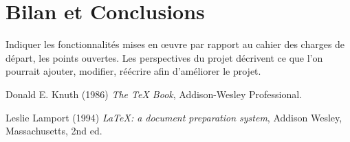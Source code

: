 \documentclass[a4paper]{article} %
\begin{document}
\section{Bilan et Conclusions}

	Indiquer les fonctionnalités mises en œuvre par rapport au cahier des charges de départ, les points ouvertes.
	Les perspectives du projet décrivent ce que l’on pourrait ajouter, modifier, réécrire afin d’améliorer le projet. 
	
\begin{thebibliography}{9}
Donald E. Knuth (1986) \emph{The \TeX{} Book}, Addison-Wesley Professional.

Leslie Lamport (1994) \emph{\LaTeX: a document preparation system}, Addison
Wesley, Massachusetts, 2nd ed.
\end{thebibliography}
\end{document}
